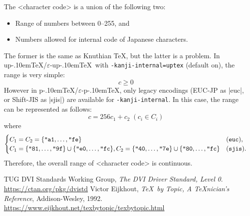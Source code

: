 \documentclass[a4paper,11pt]{article}
\let\emph=\origemph
\def\code#1{\texttt{#1}}
\def\epTeX{$\varepsilon$-\pTeX}\def\eTeX{$\varepsilon$-\TeX}
\def\eupTeX{$\varepsilon$-\upTeX}\def\upTeX{u\pTeX}
\def\pTeX{p\kern-.10em\TeX}
\begin{document}
The <character code> is a union of the following two:
\begin{itemize}
 \item Range of numbers between 0--255, and
 \item Numbers allowed for internal code of Japanese characters.
\end{itemize}
The former is the same as Knuthian \TeX, but the latter is a problem.
In \upTeX/\eupTeX\ with \code{-kanji-internal=uptex} (default on),
the range is very simple:
\[ c \ge 0 \]
However in \pTeX/\epTeX, only legacy encodings (EUC-JP as |euc|,
or Shift-JIS as |sjis|) are available for \code{-kanji-internal}.
In this case, the range can be represented as follows:
\[
  c = 256c_1+c_2 \; (c_i\in C_i)
\]
where
\[
  \begin{cases}
    C_1=C_2=\{\hex{a1},\dots,\hex{fe}\} & (\mathtt{euc}), \\
    C_1=\{\hex{81},\dots,\hex{9f}\}\cup\{\hex{e0},\dots,\hex{fc}\},
    C_2=\{\hex{40},\dots,\hex{7e}\}\cup\{\hex{80},\dots,\hex{fc}\} & (\mathtt{sjis}).
  \end{cases}
\]
Therefore, the overall range of <character code> is \emph{not} continuous.

\newpage

\begin{thebibliography}{99}
  TUG DVI Standards Working Group,
  \textit{The DVI Driver Standard, Level 0}.\\
  \url{https://ctan.org/pkg/dvistd}
  Victor Eijkhout, \textit{\TeX\ by Topic, A \TeX nician's Reference},
  Addison-Wesley, 1992.\\
  \url{https://www.eijkhout.net/texbytopic/texbytopic.html}
\end{thebibliography}

\newpage
\printindex
\end{document}
